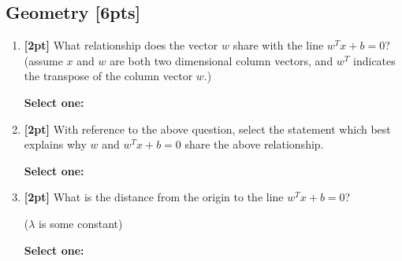\documentclass[12pt]{article}
\renewcommand{\circle}{\tikz\draw[black] (0,0) circle (1ex);}
\begin{document}
\subsection{Geometry [6pts]}
\begin{enumerate}
    \item \textbf{[2pt]} What relationship does the vector $w$ share with the line $w^Tx+b = 0$?
    (assume $x$ and $w$ are both two dimensional column vectors, and $w^T$ indicates the transpose of the column vector $w$.)
    
    \textbf{Select one:}

    
    \item \textbf{[2pt]} With reference to the above question, select the statement which best explains why $w$ and $w^Tx + b = 0$ share the above relationship.
    
    \textbf{Select one:}

    
    \item \textbf{[2pt]} What is the distance from the origin to the line $w^T x + b = 0$?
    
    ($\lambda$ is some constant)
    
    \textbf{Select one:}


  

    \clearpage
\end{enumerate}
\end{document}
